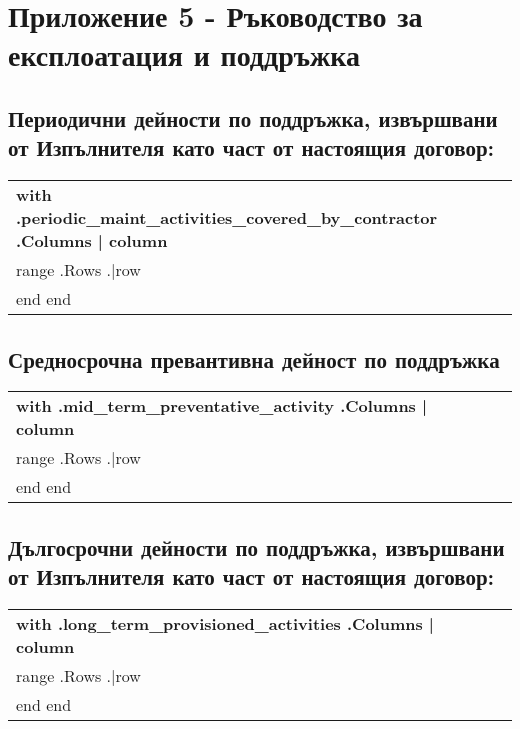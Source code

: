 \section{Приложение 5 {-} Ръководство за експлоатация и поддръжка}

\subsection{Периодични дейности по поддръжка, извършвани от Изпълнителя като част от настоящия договор:}


\begin{center}
\begin{tabu}{|X[3]|X|X|X|X|} \tabucline{} \rowfont[c]\bfseries
{{with .periodic_maint_activities_covered_by_contractor}} %
	{{.Columns | column}} \\\tabucline{}
	{{range .Rows}} %
	{{.|row}} \\\tabucline{}
	{{end}}
{{end}}
\end{tabu}
\end{center}

\subsection{Средносрочна превантивна дейност по поддръжка}


\begin{center}
\begin{tabu}{|X[3]|X|X|X|X|} \tabucline{} \rowfont[c]\bfseries
{{with .mid_term_preventative_activity}} %
	{{.Columns | column}} \\\tabucline{}
	{{range .Rows}} %
	{{.|row}} \\\tabucline{}
	{{end}}
{{end}}
\end{tabu}
\end{center}

\subsection{Дългосрочни дейности по поддръжка, извършвани от Изпълнителя като част от настоящия договор:}


\begin{center}
\begin{tabu}{|X[3]|X|X|X|X|} \tabucline{} \rowfont[c]\bfseries
{{with .long_term_provisioned_activities}} %
	{{.Columns | column}} \\\tabucline{}
	{{range .Rows}} %
	{{.|row}} \\\tabucline{}
	{{end}}
{{end}}
\end{tabu}
\end{center}

